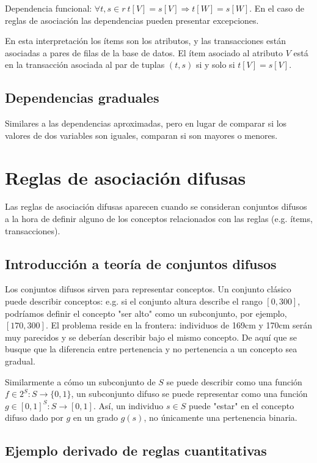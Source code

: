 \documentclass[a4paper,11pt,spanish]{report}
\let\stdsection\section
\let\stdsub\subsection
\let\stdsubsub\subsubsection
\renewcommand{\chapter}{\stdsection}
\renewcommand{\section}{\stdsub}
\renewcommand{\subsection}{\stdsubsub}
\begin{document}
Dependencia funcional: $\forall t,s\in r~ t[V]=s[V]\Rightarrow t[W]=s[W]$. En el caso de reglas de asociación las dependencias pueden presentar excepciones.

En esta interpretación los ítems son los atributos, y las transacciones están asociadas a pares de filas de la base de datos. El ítem asociado al atributo $V$ está en la transacción asociada al par de tuplas $(t,s)$ si y solo si $t[V]=s[V]$.

\section{Dependencias graduales}
\label{sec-4-3-8}

Similares a las dependencias aproximadas, pero en lugar de comparar si los valores de dos variables son iguales, comparan si son mayores o menores.

\chapter{Reglas de asociación difusas}
\label{sec-4-4}

Las reglas de asociación difusas aparecen cuando se consideran conjuntos difusos a la hora de definir alguno de los conceptos relacionados con las reglas (e.g. ítems, transacciones).

\section{Introducción a teoría de conjuntos difusos}
\label{sec-4-4-1}

Los conjuntos difusos sirven para representar conceptos. Un conjunto clásico puede describir conceptos: e.g. si el conjunto altura describe el rango $[0,300]$, podríamos definir el concepto "ser alto" como un subconjunto, por ejemplo, $[170,300]$. El problema reside en la frontera: individuos de 169cm y 170cm serán muy parecidos y se deberían describir bajo el mismo concepto. De aquí que se busque que la diferencia entre pertenencia y no pertenencia a un concepto sea gradual.

Similarmente a cómo un subconjunto de $S$ se puede describir como una función $f\in 2^S : S\rightarrow \{0,1\}$, un subconjunto difuso se puede representar como una función $g\in [0,1]^S:S\rightarrow [0,1]$. Así, un individuo $s\in S$ puede "estar" en el concepto difuso dado por $g$ en un grado $g(s)$, no únicamente una pertenencia binaria.

\section{Ejemplo derivado de reglas cuantitativas}
\label{sec-4-4-2}
\end{document}
